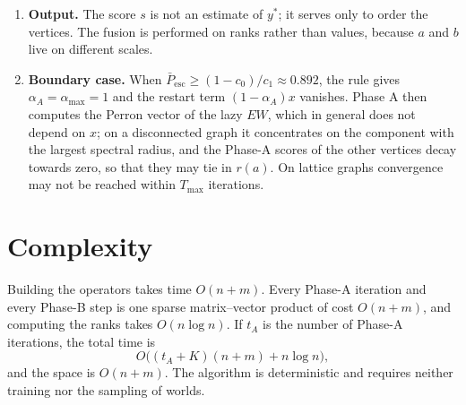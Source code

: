 \documentclass[11pt,a4paper]{article}
\newcommand{\Pescbar}{\bar{P}_{\mathrm{esc}}}
\newcommand{\Pthr}{0.892}
\begin{document}
\begin{enumerate}[leftmargin=1.5em,itemsep=3pt]
\item \textbf{Output.} The score $s$ is not an estimate of $y^*$; it serves only to order the vertices. The fusion is performed on ranks rather than values, because $a$ and $b$ live on different scales.

\item \textbf{Boundary case.} When $\Pescbar\ge(1-c_0)/c_1\approx\Pthr$, the rule gives $\alpha_A=\alpha_{\max}=1$ and the restart term $(1-\alpha_A)x$ vanishes. Phase A then computes the Perron vector of the lazy $EW$, which in general does not depend on $x$; on a disconnected graph it concentrates on the component with the largest spectral radius, and the Phase-A scores of the other vertices decay towards zero, so that they may tie in $r(a)$. On lattice graphs convergence may not be reached within $T_{\max}$ iterations.
\end{enumerate}

\section{Complexity}

Building the operators takes time $O(n+m)$. Every Phase-A iteration and every Phase-B step is one sparse matrix--vector product of cost $O(n+m)$, and computing the ranks takes $O(n\log n)$. If $t_A$ is the number of Phase-A iterations, the total time is
\[
O\big((t_A+K)(n+m)+n\log n\big),
\]
and the space is $O(n+m)$. The algorithm is deterministic and requires neither training nor the sampling of worlds.
\end{document}
